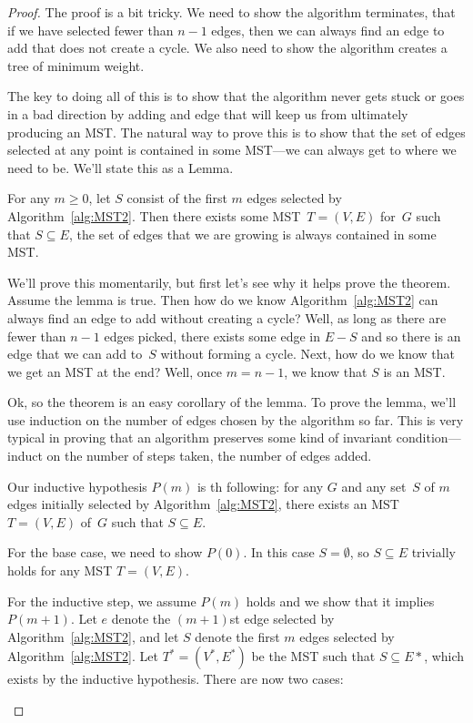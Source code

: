 \begin{proof}
The proof is a bit tricky.  We need to show the algorithm terminates,
\ie that if we have selected fewer than $n - 1$ edges, then we can
always find an edge to add that does not create a cycle.  We also need
to show the algorithm creates a tree of minimum weight.

The key to doing all of this is to show that the algorithm never gets
stuck or goes in a bad direction by adding and edge that will keep us
from ultimately producing an MST\@.  The natural way to prove this is
to show that the set of edges selected at any point is contained in
some MST---\ie we can always get to where we need to be.  We'll state
this as a Lemma.

\begin{lemma}\label{lemma:MST2}
For any $m \ge 0$, let $S$ consist of the first $m$ edges selected by
Algorithm~\ref{alg:MST2}.  Then there exists some MST~$T = (V, E)$
for~$G$ such that $S \subseteq E$, \ie the set of edges that we are
growing is always contained in some MST\@.
\end{lemma}

We'll prove this momentarily, but first let's see why it helps prove
the theorem.  Assume the lemma is true.  Then how do we know
Algorithm~\ref{alg:MST2} can always find an edge to add without
creating a cycle?  Well, as long as there are fewer than $n - 1$ edges
picked, there exists some edge in $E - S$ and so there is an edge that
we can add to~$S$ without forming a cycle.  Next, how do we know that
we get an MST at the end?  Well, once $m = n - 1$, we know that $S$ is
an MST\@.

Ok, so the theorem is an easy corollary of the lemma.  To prove the
lemma, we'll use induction on the number of edges chosen by the
algorithm so far.  This is very typical in proving that an algorithm
preserves some kind of invariant condition---induct on the number of
steps taken, \ie the number of edges added.

Our inductive hypothesis $P(m)$ is th following: for any $G$ and any
set~$S$ of $m$ edges initially selected by Algorithm~\ref{alg:MST2},
there exists an MST $T = (V, E)$ of~$G$ such that $S \subseteq E$.

For the base case, we need to show $P(0)$.  In this case $S =
\emptyset$, so $S \subseteq E$ trivially holds for any MST $T = (V,
E)$.

For the inductive step, we assume $P(m)$ holds and we show that it
implies $P(m + 1)$.  Let $e$ denote the $(m+1)$st edge selected by
Algorithm~\ref{alg:MST2}, and let $S$ denote the first $m$ edges
selected by Algorithm~\ref{alg:MST2}.  Let $T^* = (V^*, E^*)$ be the
MST such that $S \subseteq E*$, which exists by the inductive
hypothesis.  There are now two cases:
\begin{description}


\end{description}
\end{proof}
